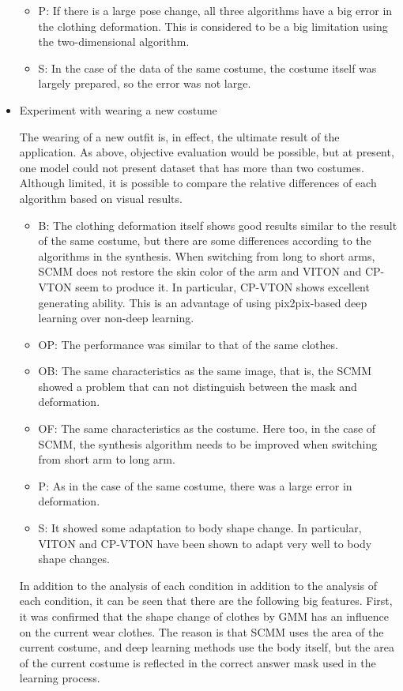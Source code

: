 \documentclass[runningheads]{llncs}
\begin{document}
\begin{itemize}
\begin{itemize}
\item P: If there is a large pose change, all three algorithms have a big error in the clothing deformation. This is considered to be a big limitation using the two-dimensional algorithm.
\item S: In the case of the data of the same costume, the costume itself was largely prepared, so the error was not large.
\end{itemize}

\item Experiment with wearing a new costume
 
The wearing of a new outfit is, in effect, the ultimate result of the application. As above, objective evaluation would be possible, but at present, one model could not present dataset that has more than two costumes. Although limited, it is possible to compare the relative differences of each algorithm based on visual results.


\begin{itemize}

\item B: The clothing deformation itself shows good results similar to the result of the same costume, but there are some differences according to the algorithms in the synthesis. When switching from long to short arms, SCMM does not restore the skin color of the arm and VITON and CP-VTON seem to produce it. In particular, CP-VTON shows excellent generating ability. This is an advantage of using pix2pix-based deep learning over non-deep learning.
\item OP: The performance was similar to that of the same clothes.
\item OB: The same characteristics as the same image, that is, the SCMM showed a problem that can not distinguish between the mask and deformation.
\item OF: The same characteristics as the costume. Here too, in the case of SCMM, the synthesis algorithm needs to be improved when switching from short arm to long arm.
\item P: As in the case of the same costume, there was a large error in deformation.
\item S: It showed some adaptation to body shape change. In particular, VITON and CP-VTON have been shown to adapt very well to body shape changes.

\end{itemize}

In addition to the analysis of each condition in addition to the analysis of each condition, it can be seen that there are the following big features. First, it was confirmed that the shape change of clothes by GMM has an influence on the current wear clothes. The reason is that SCMM uses the area of the current costume, and deep learning methods use the body itself, but the area of the current costume is reflected in the correct answer mask used in the learning process.

\end{itemize}
\end{document}
